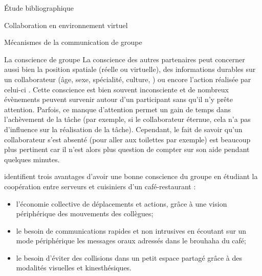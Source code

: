 \documentclass[myfrancais,ngerman,english,frenchb]{mythesis}
\begin{document}
\begin{mychapter}{Étude bibliographique}
\begin{mysection}{Collaboration en environnement virtuel}
\begin{mysubsection}{Mécanismes de la communication de groupe}
\begin{mysubsubsection}{La conscience de groupe}
					La conscience des autres partenaires peut concerner aussi bien la position spatiale (réelle ou virtuelle), des informations durables sur un collaborateur (âge, sexe, spécialité, culture, \myetc) ou encore l'action réalisée par celui-ci .
					Cette conscience est bien souvent inconsciente et de nombreux évènements peuvent survenir autour d'un participant sans qu'il n'y prête attention.
					Parfois, ce manque d'attention permet un gain de temps dans l'achèvement de la tâche (par exemple, si le collaborateur éternue, cela n'a pas d'influence sur la réalisation de la tâche).
					Cependant, le fait de savoir qu'un collaborateur s'est absenté (pour aller aux toilettes par exemple) est beaucoup plus pertinent car il n'est alors plus question de compter sur son aide pendant quelques minutes.

					 identifient trois avantages d'avoir une bonne conscience du groupe en étudiant la coopération entre serveurs et cuisiniers d'un café-restaurant :
					\begin{itemize}
						\item l'économie collective de déplacements et actions, grâce à une vision périphérique des mouvements des collègues;
						\item le besoin de communications rapides et non intrusives en écoutant sur un mode périphérique les messages oraux adressés dans le brouhaha du café;
						\item le besoin d'éviter des collisions dans un petit espace partagé grâce à des modalités visuelles et kinesthésiques.
					\end{itemize}


\end{mysubsubsection}
\end{mysubsection}
\end{mysection}
\end{mychapter}
\end{document}
